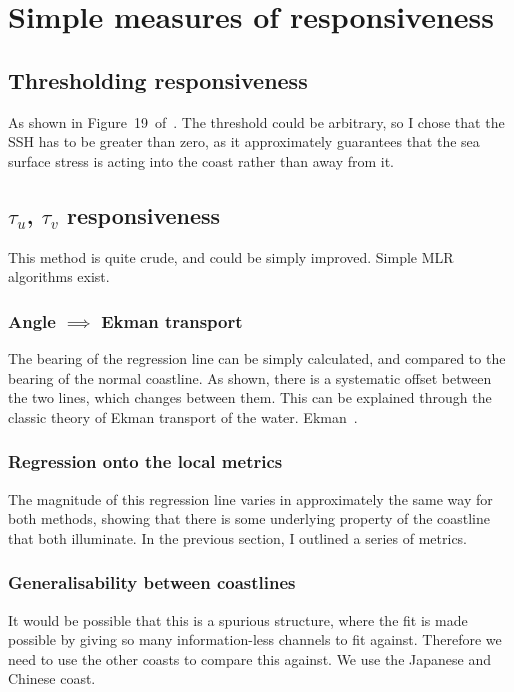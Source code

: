 \section{Simple measures of responsiveness}
\label{sec:3_ORCA12_REG.tex}


\subsection{Thresholding responsiveness}
As shown in Figure~19~of~\cite{ZannaPreprint}.
The threshold could be arbitrary,
so I chose that the SSH has to be greater than zero,
as it approximately guarantees that the sea surface stress is acting into
the coast rather than away from it.


\subsection{$\tau_u$, $\tau_v$ responsiveness}
\label{sec:tau-tau}
This method is quite crude, and could be simply improved.
Simple MLR algorithms exist.



\subsubsection{Angle $\implies$ Ekman transport}
\label{sec:angle}

The bearing of the regression line can be simply calculated,
and compared to the bearing of the normal coastline.
As shown, there is a systematic offset between the two lines,
which changes between them. This can be explained through the
classic theory of Ekman transport of the water.
Ekman~\cite{hope2013hindcast}.



\subsubsection{Regression onto the local metrics}
\label{sec:reg-metrics}

The magnitude of this regression line varies in approximately the same
way for both methods, showing that there is some underlying property of the
coastline that both illuminate. In the previous section, I outlined
a series of metrics.

\subsubsection{Generalisability between coastlines}
\label{sec:generalisability}

It would be possible that this is a spurious structure, where the fit
is made possible by giving so many information-less channels to fit against.
Therefore we need to use the other coasts to compare this against.
We use the Japanese and Chinese coast.



\FloatBarrier
